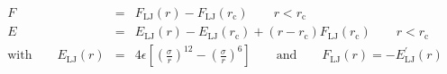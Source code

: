 \documentclass[12pt]{article}
\begin{document}
\begin{eqnarray*}
 F & = & F_{\mathrm{LJ}}(r) - F_{\mathrm{LJ}}(r_{\mathrm{c}}) \qquad r < r_{\mathrm{c}} \\
 E & = & E_{\mathrm{LJ}}(r) - E_{\mathrm{LJ}}(r_{\mathrm{c}}) + (r - r_{\mathrm{c}}) F_{\mathrm{LJ}}(r_{\mathrm{c}}) \qquad r < r_{\mathrm{c}} \\
 \mathrm{with} \qquad E_{\mathrm{LJ}}(r) & = & 4 \epsilon \left[ \left(\frac{\sigma}{r}\right)^{12} - \left(\frac{\sigma}{r}\right)^6 \right] \qquad \mathrm{and} \qquad F_{\mathrm{LJ}}(r) = - E^\prime_{\mathrm{LJ}}(r)
\end{eqnarray*}                           
\end{document}
